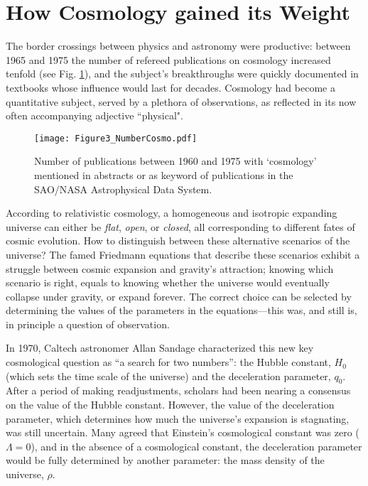 \documentclass{naturefig}
\begin{document}
\vspace{8pt}



\section*{How Cosmology gained its Weight}

The border crossings between physics and astronomy were productive: between 1965 and 1975 the number of refereed publications on cosmology increased tenfold (see Fig. \ref{fig:cosm}), and the subject's breakthroughs were quickly documented in textbooks whose influence would last for decades.\cite{Peebles1971,Sciama1971a,Weinberg1972,Misner1973,Hawking1973} Cosmology had become a quantitative subject, served by a plethora of observations, as reflected in its now often accompanying adjective  ``physical".\cite{Peebles1971,Smith2008a}

\begin{figure}
\centering
\texttt{[image: Figure3\_NumberCosmo.pdf]}
\caption{\label{fig:cosm}
Number of publications between 1960 and 1975 with `cosmology' mentioned in abstracts or as keyword of publications in the SAO/NASA Astrophysical Data System.}
\end{figure}

According to relativistic cosmology, a homogeneous and isotropic expanding universe can either be \textit{flat}, \textit{open}, or \textit{closed}, all corresponding to different fates of cosmic evolution. How to distinguish between these alternative scenarios of the universe?  The famed Friedmann equations that describe these scenarios
exhibit a struggle between cosmic expansion and gravity's attraction;  knowing which scenario is right, equals to knowing whether the universe would eventually collapse under gravity, or expand forever. The correct choice can be selected by determining the values of the parameters in the equations---this was, and still is, in principle a question of observation.

In 1970, Caltech astronomer Allan Sandage characterized this new key cosmological question as ``a search for two numbers'':\cite{Sandage1970}  the Hubble constant, $H_0$ (which sets the time scale of the universe) and the deceleration parameter, $q_0$. After a period of making readjustments, scholars had been nearing a consensus on the value of the Hubble constant.\cite{Trimble1996} However, the value of the deceleration parameter, which determines how much the universe's expansion is stagnating, was still uncertain. Many agreed that Einstein's cosmological constant was zero ($\Lambda=0$), and in the absence of a cosmological constant, the deceleration parameter would be fully determined by another parameter: the mass density of the universe, $\rho$.
\end{document}
